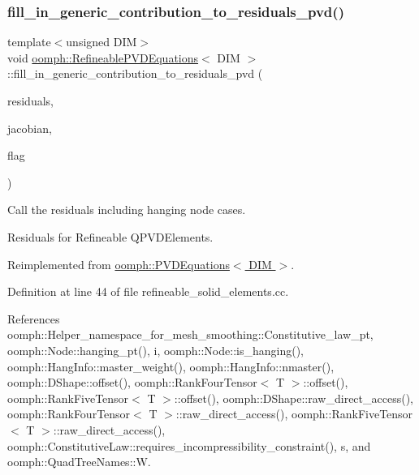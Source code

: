 \subsubsection{\texorpdfstring{fill\+\_\+in\+\_\+generic\+\_\+contribution\+\_\+to\+\_\+residuals\+\_\+pvd()}{fill\_in\_generic\_contribution\_to\_residuals\_pvd()}}
{\footnotesize\ttfamily template$<$unsigned D\+IM$>$ \\
void \hyperlink{classoomph_1_1RefineablePVDEquations}{oomph\+::\+Refineable\+P\+V\+D\+Equations}$<$ D\+IM $>$\+::fill\+\_\+in\+\_\+generic\+\_\+contribution\+\_\+to\+\_\+residuals\+\_\+pvd (\begin{DoxyParamCaption}\item[{\hyperlink{classoomph_1_1Vector}{Vector}$<$ double $>$ \&}]{residuals,  }\item[{\hyperlink{classoomph_1_1DenseMatrix}{Dense\+Matrix}$<$ double $>$ \&}]{jacobian,  }\item[{const unsigned \&}]{flag }\end{DoxyParamCaption})\hspace{0.3cm}{\ttfamily [virtual]}}



Call the residuals including hanging node cases. 

Residuals for Refineable Q\+P\+V\+D\+Elements. 

Reimplemented from \hyperlink{classoomph_1_1PVDEquations_a2e169e572d3715f08e571cb29779a754}{oomph\+::\+P\+V\+D\+Equations$<$ D\+I\+M $>$}.



Definition at line 44 of file refineable\+\_\+solid\+\_\+elements.\+cc.



References oomph\+::\+Helper\+\_\+namespace\+\_\+for\+\_\+mesh\+\_\+smoothing\+::\+Constitutive\+\_\+law\+\_\+pt, oomph\+::\+Node\+::hanging\+\_\+pt(), i, oomph\+::\+Node\+::is\+\_\+hanging(), oomph\+::\+Hang\+Info\+::master\+\_\+weight(), oomph\+::\+Hang\+Info\+::nmaster(), oomph\+::\+D\+Shape\+::offset(), oomph\+::\+Rank\+Four\+Tensor$<$ T $>$\+::offset(), oomph\+::\+Rank\+Five\+Tensor$<$ T $>$\+::offset(), oomph\+::\+D\+Shape\+::raw\+\_\+direct\+\_\+access(), oomph\+::\+Rank\+Four\+Tensor$<$ T $>$\+::raw\+\_\+direct\+\_\+access(), oomph\+::\+Rank\+Five\+Tensor$<$ T $>$\+::raw\+\_\+direct\+\_\+access(), oomph\+::\+Constitutive\+Law\+::requires\+\_\+incompressibility\+\_\+constraint(), s, and oomph\+::\+Quad\+Tree\+Names\+::W.



